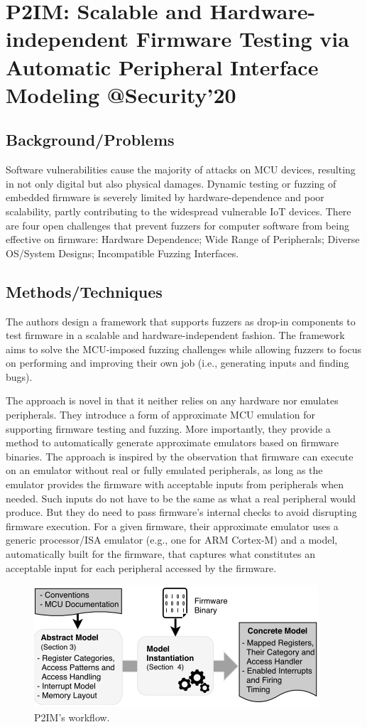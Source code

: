 \section{P2IM: Scalable and Hardware-independent Firmware Testing via Automatic Peripheral Interface Modeling @Security'20}
\subsection{Background/Problems}
Software vulnerabilities cause the majority of attacks on MCU devices, resulting in not only digital but also physical damages. Dynamic testing or fuzzing of embedded firmware is severely limited by hardware-dependence and poor scalability, partly contributing to the widespread vulnerable IoT devices. There are four open challenges that prevent fuzzers for computer software from being effective on firmware: Hardware Dependence; Wide Range of Peripherals; Diverse OS/System Designs; Incompatible Fuzzing Interfaces.
\subsection{Methods/Techniques}
The authors design a framework that supports fuzzers as drop-in components to test firmware in a scalable and hardware-independent fashion.  The framework aims to solve the MCU-imposed fuzzing challenges while allowing fuzzers to focus on performing and improving their own job (i.e., generating inputs and finding bugs). 

The approach is novel in that it neither relies on any hardware nor emulates peripherals. They introduce a form of approximate MCU emulation for supporting firmware testing and fuzzing. More importantly, they provide a method to automatically generate approximate emulators based on firmware binaries. The approach is inspired by the observation that firmware can execute on an emulator without real or fully emulated peripherals, as long as the emulator provides the firmware with acceptable inputs from peripherals when needed. Such inputs do not have to be the same as what a real peripheral would produce. But they do need to pass firmware’s internal checks to avoid disrupting firmware execution. For a given firmware, their approximate emulator uses a generic processor/ISA emulator (e.g., one for ARM Cortex-M) and a model, automatically built for the firmware, that captures what constitutes an acceptable input for each peripheral accessed by the firmware.
\begin{figure}[h]
    \centering
    \includegraphics[width=.8\linewidth]{p2im.png} %
    \caption{P2IM's workflow.}	
    \label{fig:p2im}
\end{figure}
